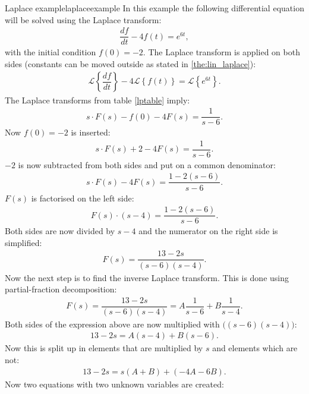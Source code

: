 \begin{example}{Laplace example}{laplaceexample}
In this example the following differential equation will be solved using the Laplace transform:
\begin{align}
\dfrac{df}{dt}-4f(t)=e^{6t}, \label{eq:lap_ex}
\end{align} 
with the initial condition $f(0)=-2$. The Laplace transform is applied on both sides (constants can be moved outside as stated in \cref{the:lin_laplace}):
\begin{align*}
\mathcal{L} \left\{\dfrac{df}{dt} \right\}-4 
\mathcal{L} \left\{f(t) \right\} = 
\mathcal{L} \left\{e^{6t} \right\}.
\end{align*}
The Laplace transforms from table \ref{lptable} imply:
\begin{align*}
s \cdot F(s) - f(0) - 4F(s)= \dfrac{1}{s-6}.
\end{align*}
Now $f(0)=-2$ is inserted:
\begin{align*}
s \cdot F(s) + 2 - 4F(s)= \dfrac{1}{s-6}.
\end{align*}
$-2$ is now subtracted from both sides and put on a common denominator:
\begin{align*}
s \cdot F(s) - 4F(s)= \dfrac{1-2(s-6)}{s-6}.
\end{align*}
$F(s)$ is factorised on the left side:
\begin{align*}
F(s) \cdot (s-4) = \dfrac{1-2(s-6)}{s-6}.
\end{align*}
Both sides are now divided by $s-4$ and the numerator on the right side is simplified:
\begin{align*}
F(s) = \dfrac{13-2s}{(s-6)(s-4)}.
\end{align*}
Now the next step is to find the inverse Laplace transform. This is done using partial-fraction decomposition: \cite[p.~537]{calc}
\begin{align}
F(s) = \dfrac{13-2s}{(s-6)(s-4)} = A \dfrac{1}{s-6} + B \dfrac{1}{s-4}.
\label{par_dec}
\end{align}
Both sides of the expression above are now multiplied with $\big((s-6)(s-4)\big)$:
\begin{align*}
13-2s = A(s-4) + B(s-6).
\end{align*}
Now this is split up in elements that are multiplied by $s$ and elements which are not:
\begin{align*}
13-2s = s(A+B)+(-4A-6B).
\end{align*}
Now two equations with two unknown variables are created:
\begin{align*}

\end{align*}
\end{example}
